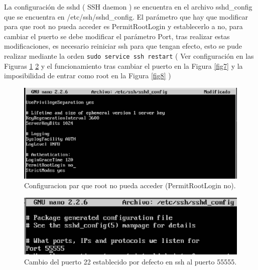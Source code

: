 La configuración de sshd ( SSH daemon ) se encuentra en el archivo sshd\_config que se encuentra en /etc/ssh/sshd\_config. El parámetro que hay que modificar para que root no pueda acceder es PermitRootLogin y establecerlo a no, para cambiar el puerto se debe modificar el parámetro Port, tras realizar estas modificaciones, es necesario reiniciar ssh para que tengan efecto, esto se pude realizar mediante la orden \texttt{sudo service ssh restart} ( Ver configuración en las Figuras \ref{fig5} \ref{fig6} y el funcionamiento tras cambiar el puerto en la Figura \ref{fig7} y la imposibilidad de entrar como root en la Figura \ref{fig8} ) \cite{sshd}

\begin{figure}[H]
    \begin{center}
        \includegraphics[scale=0.6]{imagenes/img5.eps}
        \caption{Configuracion par que root no pueda acceder (PermitRootLogin no).}
        \label{fig5}
    \end{center}
\end{figure}

\begin{figure}[H]
    \begin{center}
        \includegraphics[scale=0.7]{imagenes/img7.eps}
        \caption{Cambio del puerto 22 establecido por defecto en ssh al puerto 55555.}
        \label{fig6}
    \end{center}
\end{figure}

